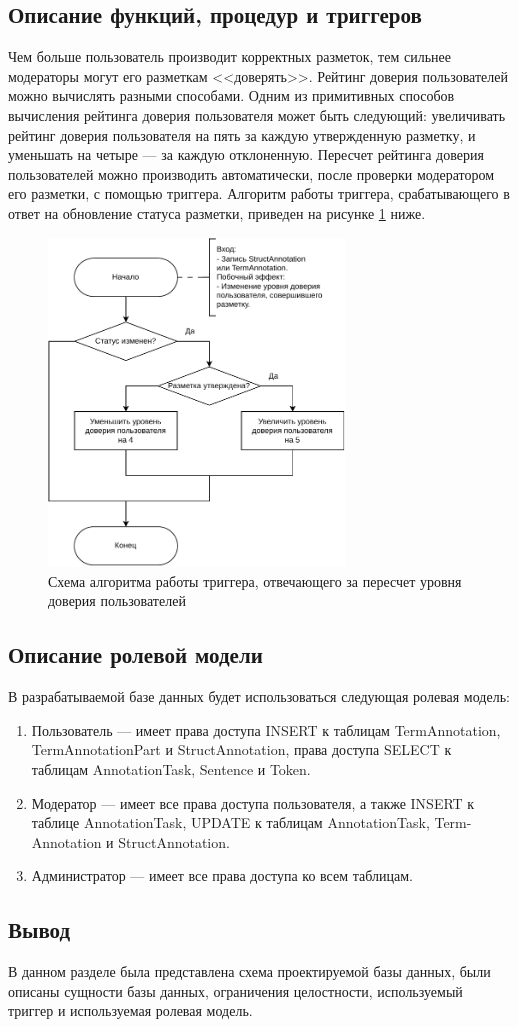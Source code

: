 \subsection{Описание функций, процедур и триггеров}

Чем больше пользователь производит корректных разметок, тем сильнее модераторы могут его разметкам <<доверять>>.
Рейтинг доверия пользователей можно вычислять разными способами.
Одним из примитивных способов вычисления рейтинга доверия пользователя может быть следующий: увеличивать рейтинг доверия пользователя на пять за каждую утвержденную разметку, и уменьшать на четыре --- за каждую отклоненную.
Пересчет рейтинга доверия пользователей можно производить автоматически, после проверки модератором его разметки, с помощью триггера.
Алгоритм работы триггера, срабатывающего в ответ на обновление статуса разметки, приведен на рисунке \ref{fig:trig} ниже.

\begin{figure}[H]
	\centering
	\includegraphics[width=0.7\textwidth]{diag/trig-v3.pdf}
	\caption{Схема алгоритма работы триггера, отвечающего за пересчет уровня доверия пользователей}
	\label{fig:trig}
\end{figure}

\subsection{Описание ролевой модели}

В разрабатываемой базе данных будет использоваться следующая ролевая модель:
\begin{enumerate}
    \item Пользователь --- имеет права доступа INSERT к таблицам TermAnnotation, TermAnnotationPart и StructAnnotation, права доступа SELECT к таблицам AnnotationTask, Sentence и Token.
    \item Модератор --- имеет все права доступа пользователя, а также INSERT к таблице AnnotationTask, UPDATE к таблицам AnnotationTask, Term-Annotation и StructAnnotation.
    \item Администратор --- имеет все права доступа ко всем таблицам.
\end{enumerate}

\subsection{Вывод}

В данном разделе была представлена схема проектируемой базы данных, были описаны сущности базы данных, ограничения целостности, используемый триггер и используемая ролевая модель.
